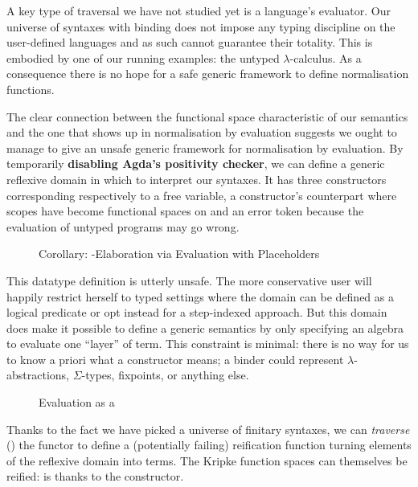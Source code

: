 A key type of traversal we have not studied yet is a language's evaluator. Our
universe of syntaxes with binding does not impose any typing discipline on the
user-defined languages and as such cannot guarantee their totality. This is
embodied by one of our running examples: the untyped $\lambda$-calculus. As a
consequence there is no hope for a safe generic framework to define normalisation
functions.

The clear connection between the  functional space characteristic of
our semantics and the one that shows up in normalisation by evaluation suggests
we ought to manage to give an unsafe generic framework for normalisation by evaluation.
By temporarily \textbf{disabling Agda's positivity checker}, we can define a
generic reflexive domain  in which to interpret our syntaxes. It has three
constructors corresponding respectively to a free variable, a constructor's
counterpart where scopes have become  functional spaces on 
and an error token because the evaluation of untyped programs may go wrong.

\begin{figure}[h]
\caption{Corollary: -Elaboration via Evaluation with Placeholders}
\end{figure}

This datatype definition is utterly unsafe. The more conservative user will happily
restrict herself to typed settings where the domain can be defined as a logical
predicate or opt instead for a step-indexed approach. But this domain does make it
possible to define a generic  semantics by only specifying an algebra to
evaluate one ``layer'' of term. This constraint is minimal: there is no way for
us to know a priori what a constructor means; a binder could represent
$\lambda$-abstractions, $\Sigma$-types, fixpoints, or anything else.

\begin{figure}[h]
\caption{Evaluation as a }
\end{figure}

Thanks to the fact we have picked a universe of finitary syntaxes, we can
\emph{traverse} (\cite{mcbride_paterson_2008}) the functor to define a
(potentially failing) reification function turning elements of the reflexive
domain into terms. The Kripke function spaces can themselves be reified:
 is  thanks to the  constructor.

